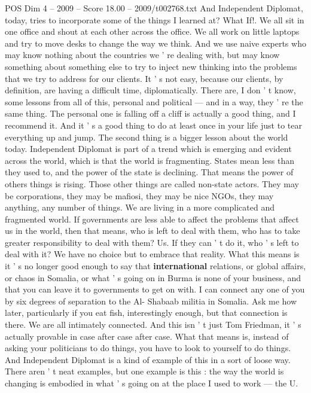 \begin{textsample}{POS Dim 4 – 2009 – Score 18.00 – 2009/t002768.txt}
And Independent Diplomat, today, tries to incorporate some of the things I learned at?
What If!.
We all sit in one office and shout at each other across the office.
We all work on little laptops and try to move desks to change the way we think.
And we use naive experts who may know nothing about the countries we ' re dealing with, but may know something about something else to try to inject new thinking into the problems that we try to address for our clients.
It ' s not easy, because our clients, by definition, are having a difficult time, diplomatically.
There are, I don ' t know, some lessons from all of this, personal and political — and in a way, they ' re the same thing.
The personal one is falling off a cliff is actually a good thing, and I recommend it.
And it ' s a good thing to do at least once in your life just to tear everything up and jump.
The second thing is a bigger lesson about the world today.
Independent Diplomat is part of a trend which is emerging and evident across the world, which is that the world is fragmenting.
States mean less than they used to, and the power of the state is declining.
That means the power of others things is rising.
Those other things are called non-state actors.
They may be corporations, they may be mafiosi, they may be nice NGOs, they may anything, any number of things.
We are living in a more complicated and fragmented world.
If governments are less able to affect the problems that affect us in the world, then that means, who is left to deal with them, who has to take greater responsibility to deal with them?
Us.
If they can ' t do it, who ' s left to deal with it?
We have no choice but to embrace that reality.
What this means is it ' s no longer good enough to say that \textbf{international} relations, or global affairs, or chaos in Somalia, or what ' s going on in Burma is none of your business, and that you can leave it to governments to get on with.
I can connect any one of you by six degrees of separation to the Al- Shabaab militia in Somalia.
Ask me how later, particularly if you eat fish, interestingly enough, but that connection is there.
We are all intimately connected.
And this isn ' t just Tom Friedman, it ' s actually provable in case after case after case.
What that means is, instead of asking your politicians to do things, you have to look to yourself to do things.
And Independent Diplomat is a kind of example of this in a sort of loose way.
There aren ' t neat examples, but one example is this : the way the world is changing is embodied in what ' s going on at the place I used to work — the U.

\end{textsample}
